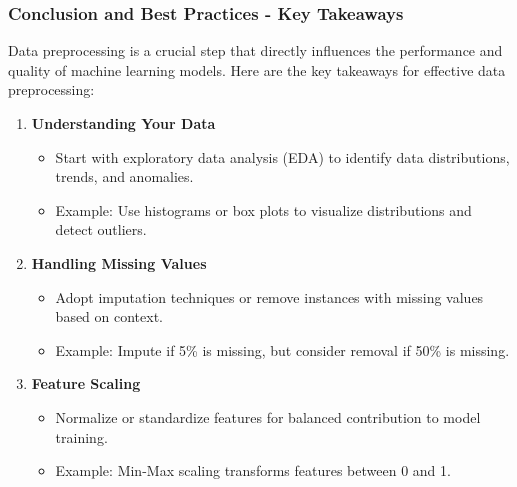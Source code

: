 \documentclass[aspectratio=169]{beamer}
\begin{document}
\begin{frame}[fragile]
  \frametitle{Conclusion and Best Practices - Key Takeaways}
  
  Data preprocessing is a crucial step that directly influences the performance and quality of machine learning models. Here are the key takeaways for effective data preprocessing:

  \begin{enumerate}
    \item \textbf{Understanding Your Data}
      \begin{itemize}
        \item Start with exploratory data analysis (EDA) to identify data distributions, trends, and anomalies.
        \item Example: Use histograms or box plots to visualize distributions and detect outliers.
      \end{itemize}
    
    \item \textbf{Handling Missing Values}
      \begin{itemize}
        \item Adopt imputation techniques or remove instances with missing values based on context.
        \item Example: Impute if 5\% is missing, but consider removal if 50\% is missing.
      \end{itemize}

    \item \textbf{Feature Scaling}
      \begin{itemize}
        \item Normalize or standardize features for balanced contribution to model training.
        \item Example: Min-Max scaling transforms features between 0 and 1.
      \end{itemize}
  \end{enumerate}
\end{frame}
\end{document}
